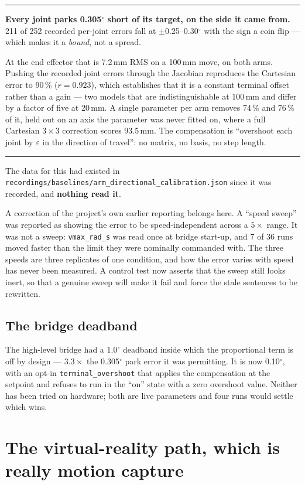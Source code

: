 \documentclass[11pt,a4paper,oneside]{report}
\newcommand{\code}[1]{\texttt{\small #1}}
\newcommand{\file}[1]{\texttt{\small #1}}
\newcommand{\dg}{$^{\circ}$}
\newcommand{\keyfact}[1]{%
  \par\vspace{7pt}\noindent
  \hspace*{0pt}\textcolor{srlblue}{\rule{2.5pt}{\dimexpr\baselineskip\relax}}%
  \hspace{9pt}%
  \begin{minipage}[t]{\dimexpr\textwidth-14pt\relax}
  \small #1
  \end{minipage}\par\vspace{7pt}}
\begin{document}
\keyfact{\textbf{Every joint parks 0.305\dg{} short of its target, on the side
it came from.} 211 of 252 recorded per-joint errors fall at $\pm$0.25--0.30\dg{}
with the sign a coin flip --- which makes it a \emph{bound}, not a spread.}

At the end effector that is 7.2\,mm RMS on a 100\,mm move, on both arms.
Pushing the recorded joint errors through the Jacobian reproduces the Cartesian
error to 90\,\% ($r = 0.923$), which establishes that it is a constant terminal
offset rather than a gain --- two models that are indistinguishable at 100\,mm
and differ by a factor of five at 20\,mm. A single parameter per arm removes
74\,\% and 76\,\% of it, held out on an axis the parameter was never fitted on,
where a full Cartesian $3\times3$ correction scores 93.5\,mm. The compensation
is ``overshoot each joint by $\varepsilon$ in the direction of travel'': no
matrix, no basis, no step length.

\keyfact{The data for this had existed in
\file{recordings/baselines/arm\_directional\_calibration.json} since it was
recorded, and \textbf{nothing read it}.}

A correction of the project's own earlier reporting belongs here. A ``speed
sweep'' was reported as showing the error to be speed-independent across a
$5\times$ range. It was not a sweep: \code{vmax\_rad\_s} was read once at bridge
start-up, and 7 of 36 runs moved faster than the limit they were nominally
commanded with. The three speeds are three replicates of one condition, and how
the error varies with speed has never been measured. A control test now asserts
that the sweep still looks inert, so that a genuine sweep will make it fail and
force the stale sentences to be rewritten.

\section{The bridge deadband}

The high-level bridge had a 1.0\dg{} deadband inside which the proportional
term is off by design --- $3.3\times$ the 0.305\dg{} park error it was
permitting. It is now 0.10\dg, with an opt-in \code{terminal\_overshoot} that
applies the compensation at the setpoint and refuses to run in the ``on'' state
with a zero overshoot value. Neither has been tried on hardware; both are live
parameters and four runs would settle which wins.

\chapter{The virtual-reality path, which is really motion capture}
\end{document}
